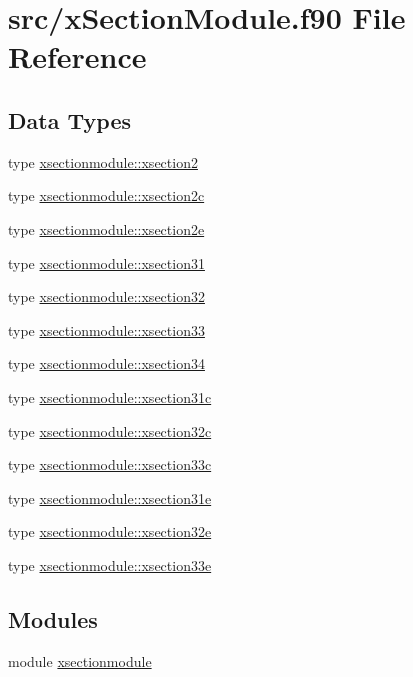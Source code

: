 \hypertarget{x_section_module_8f90}{}\section{src/x\+Section\+Module.f90 File Reference}
\label{x_section_module_8f90}
\subsection*{Data Types}
\begin{DoxyCompactItemize}
\item 
type \hyperlink{structxsectionmodule_1_1xsection2}{xsectionmodule\+::xsection2}
\item 
type \hyperlink{structxsectionmodule_1_1xsection2c}{xsectionmodule\+::xsection2c}
\item 
type \hyperlink{structxsectionmodule_1_1xsection2e}{xsectionmodule\+::xsection2e}
\item 
type \hyperlink{structxsectionmodule_1_1xsection31}{xsectionmodule\+::xsection31}
\item 
type \hyperlink{structxsectionmodule_1_1xsection32}{xsectionmodule\+::xsection32}
\item 
type \hyperlink{structxsectionmodule_1_1xsection33}{xsectionmodule\+::xsection33}
\item 
type \hyperlink{structxsectionmodule_1_1xsection34}{xsectionmodule\+::xsection34}
\item 
type \hyperlink{structxsectionmodule_1_1xsection31c}{xsectionmodule\+::xsection31c}
\item 
type \hyperlink{structxsectionmodule_1_1xsection32c}{xsectionmodule\+::xsection32c}
\item 
type \hyperlink{structxsectionmodule_1_1xsection33c}{xsectionmodule\+::xsection33c}
\item 
type \hyperlink{structxsectionmodule_1_1xsection31e}{xsectionmodule\+::xsection31e}
\item 
type \hyperlink{structxsectionmodule_1_1xsection32e}{xsectionmodule\+::xsection32e}
\item 
type \hyperlink{structxsectionmodule_1_1xsection33e}{xsectionmodule\+::xsection33e}
\end{DoxyCompactItemize}
\subsection*{Modules}
\begin{DoxyCompactItemize}
\item 
module \hyperlink{namespacexsectionmodule}{xsectionmodule}
\end{DoxyCompactItemize}
